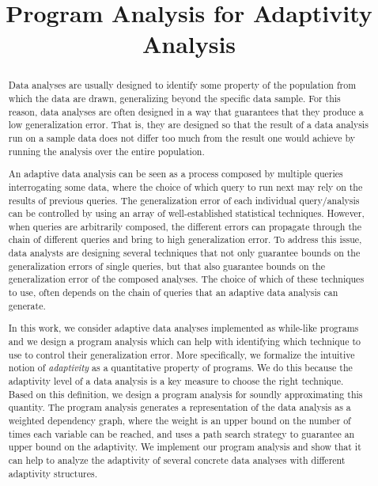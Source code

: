 \documentclass[a4paper,11pt]{article}
\begin{document}
\title{Program Analysis for Adaptivity Analysis}

\author{}

\date{}
\maketitle

\begin{abstract}
    Data analyses are usually designed to identify some property of the population from which the data are drawn, generalizing beyond the specific data sample. For this reason, data analyses are often designed in a way that guarantees that they produce a low generalization error.
    That is, they are designed so that the result of a data analysis run on a sample data does not differ too much from the result one would achieve by running the analysis over the entire population. 
   
   An adaptive data analysis can be seen as a process composed by multiple queries interrogating some data, where the choice of which query to run next may rely on the results of previous queries. 
   The generalization error of each individual query/analysis can be controlled by using an array of well-established statistical techniques.
   However, when queries are arbitrarily composed, the different errors can propagate through the chain of different queries and bring to high generalization error. 
   To address this issue, data analysts are designing several techniques that not only guarantee bounds on the generalization errors of single queries, but that also guarantee bounds on the generalization error of the composed analyses. 
   The choice of which of these techniques to use, often depends on the chain of queries that an adaptive data analysis can generate.
   
   In this work, we consider adaptive data analyses implemented as while-like programs and we design a program analysis which can help with identifying which technique to use to control their generalization error. 
   More specifically, we formalize the intuitive notion of \emph{adaptivity} as a quantitative property of programs. 
   We do this because the adaptivity level of a data analysis is a key measure to choose the right technique. 
   Based on this definition, we design a program analysis for soundly approximating this quantity.
   The program analysis generates a representation of the data analysis as a weighted dependency graph, where the weight is an upper bound on the number of times each variable can be reached, and uses a path search strategy to guarantee an upper bound on the adaptivity. 
   We implement our program analysis  and show that it can help to analyze the adaptivity of several concrete data analyses with different adaptivity structures.
\end{abstract}
%
\tableofcontents
\end{document}
